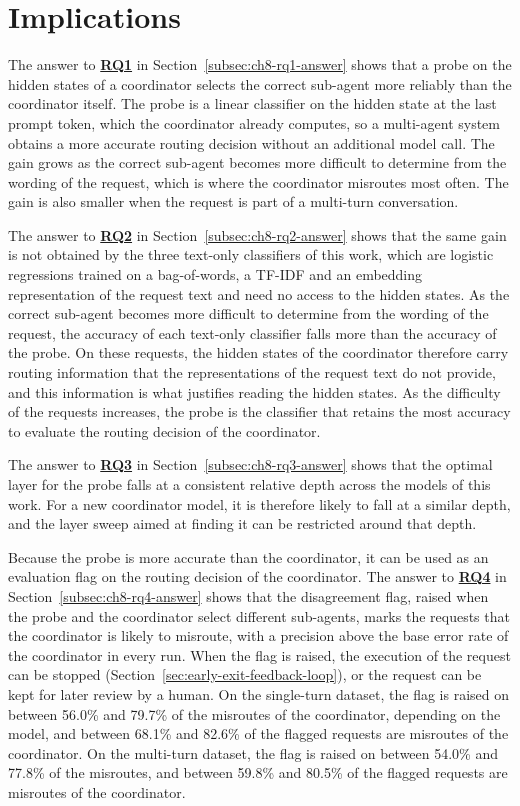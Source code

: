\section{Implications}
\label{sec:ch9-implications}

The answer to \hyperref[rq:ch8-rq1]{\textbf{RQ1}} in Section~\ref{subsec:ch8-rq1-answer} shows that a probe on the hidden states of a coordinator selects the correct sub-agent more reliably than the coordinator itself. The probe is a linear classifier on the hidden state at the last prompt token, which the coordinator already computes, so a multi-agent system obtains a more accurate routing decision without an additional model call. The gain grows as the correct sub-agent becomes more difficult to determine from the wording of the request, which is where the coordinator misroutes most often. The gain is also smaller when the request is part of a multi-turn conversation.

The answer to \hyperref[rq:ch8-rq2]{\textbf{RQ2}} in Section~\ref{subsec:ch8-rq2-answer} shows that the same gain is not obtained by the three text-only classifiers of this work, which are logistic regressions trained on a bag-of-words, a TF-IDF and an embedding representation of the request text and need no access to the hidden states. As the correct sub-agent becomes more difficult to determine from the wording of the request, the accuracy of each text-only classifier falls more than the accuracy of the probe. On these requests, the hidden states of the coordinator therefore carry routing information that the representations of the request text do not provide, and this information is what justifies reading the hidden states. As the difficulty of the requests increases, the probe is the classifier that retains the most accuracy to evaluate the routing decision of the coordinator.

The answer to \hyperref[rq:ch8-rq3]{\textbf{RQ3}} in Section~\ref{subsec:ch8-rq3-answer} shows that the optimal layer for the probe falls at a consistent relative depth across the models of this work. For a new coordinator model, it is therefore likely to fall at a similar depth, and the layer sweep aimed at finding it can be restricted around that depth.

Because the probe is more accurate than the coordinator, it can be used as an evaluation flag on the routing decision of the coordinator. The answer to \hyperref[rq:ch8-rq4]{\textbf{RQ4}} in Section~\ref{subsec:ch8-rq4-answer} shows that the disagreement flag, raised when the probe and the coordinator select different sub-agents, marks the requests that the coordinator is likely to misroute, with a precision above the base error rate of the coordinator in every run. When the flag is raised, the execution of the request can be stopped (Section~\ref{sec:early-exit-feedback-loop}), or the request can be kept for later review by a human. On the single-turn dataset, the flag is raised on between 56.0\% and 79.7\% of the misroutes of the coordinator, depending on the model, and between 68.1\% and 82.6\% of the flagged requests are misroutes of the coordinator. On the multi-turn dataset, the flag is raised on between 54.0\% and 77.8\% of the misroutes, and between 59.8\% and 80.5\% of the flagged requests are misroutes of the coordinator.

